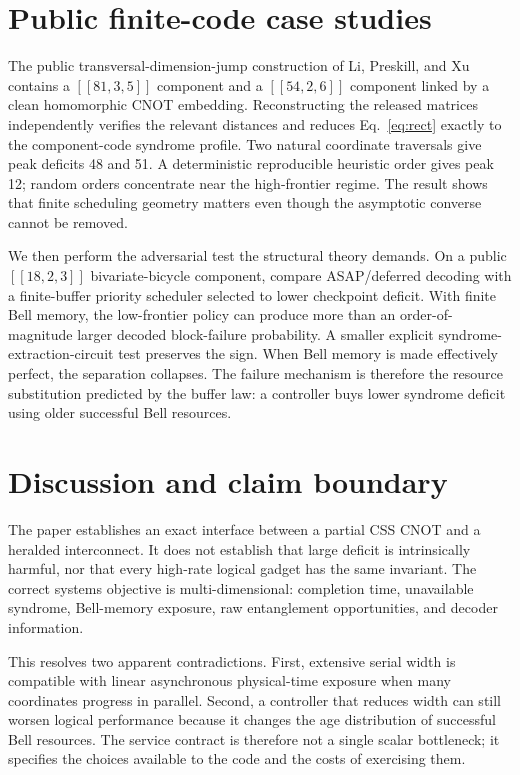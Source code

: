 \documentclass[aps,prx,reprint,superscriptaddress,nofootinbib,longbibliography,floatfix]{revtex4-2}
\begin{document}
\section{Public finite-code case studies}
The public transversal-dimension-jump construction of Li, Preskill, and Xu contains a $[[81,3,5]]$ component and a $[[54,2,6]]$ component linked by a clean homomorphic CNOT embedding. Reconstructing the released matrices independently verifies the relevant distances and reduces Eq.~\eqref{eq:rect} exactly to the component-code syndrome profile. Two natural coordinate traversals give peak deficits 48 and 51. A deterministic reproducible heuristic order gives peak 12; random orders concentrate near the high-frontier regime. The result shows that finite scheduling geometry matters even though the asymptotic converse cannot be removed.

We then perform the adversarial test the structural theory demands. On a public $[[18,2,3]]$ bivariate-bicycle component, compare ASAP/deferred decoding with a finite-buffer priority scheduler selected to lower checkpoint deficit. With finite Bell memory, the low-frontier policy can produce more than an order-of-magnitude larger decoded block-failure probability. A smaller explicit syndrome-extraction-circuit test preserves the sign. When Bell memory is made effectively perfect, the separation collapses. The failure mechanism is therefore the resource substitution predicted by the buffer law: a controller buys lower syndrome deficit using older successful Bell resources.

\section{Discussion and claim boundary}
The paper establishes an exact interface between a partial CSS CNOT and a heralded interconnect. It does not establish that large deficit is intrinsically harmful, nor that every high-rate logical gadget has the same invariant. The correct systems objective is multi-dimensional: completion time, unavailable syndrome, Bell-memory exposure, raw entanglement opportunities, and decoder information.

This resolves two apparent contradictions. First, extensive serial width is compatible with linear asynchronous physical-time exposure when many coordinates progress in parallel. Second, a controller that reduces width can still worsen logical performance because it changes the age distribution of successful Bell resources. The service contract is therefore not a single scalar bottleneck; it specifies the choices available to the code and the costs of exercising them.
\end{document}
